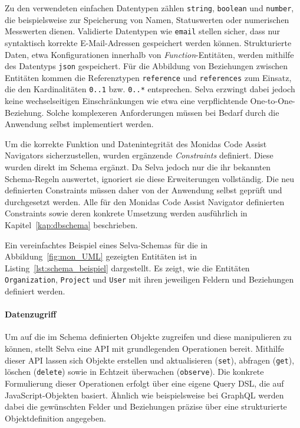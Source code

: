 Zu den verwendeten einfachen Datentypen zählen \texttt{string}, \texttt{boolean} und \texttt{number}, die beispielsweise zur Speicherung von Namen, Statuswerten oder numerischen Messwerten dienen. Validierte Datentypen wie \texttt{email} stellen sicher, dass nur syntaktisch korrekte E-Mail-Adressen gespeichert werden können. Strukturierte Daten, etwa Konfigurationen innerhalb von \textit{Function}-Entitäten, werden mithilfe des Datentyps \texttt{json} gespeichert. Für die Abbildung von Beziehungen zwischen Entitäten kommen die Referenztypen \texttt{reference} und \texttt{references} zum Einsatz, die den Kardinalitäten \texttt{0..1} bzw. \texttt{0..*} entsprechen. Selva erzwingt dabei jedoch keine wechselseitigen Einschränkungen wie etwa eine verpflichtende One-to-One-Beziehung. Solche komplexeren Anforderungen müssen bei Bedarf durch die Anwendung selbst implementiert werden.



Um die korrekte Funktion und Datenintegrität des Monidas Code Assist Navigators sicherzustellen, wurden ergänzende \textit{Constraints} definiert. Diese wurden direkt im Schema ergänzt. Da Selva jedoch nur die ihr bekannten Schema-Regeln auswertet, ignoriert sie diese Erweiterungen vollständig. Die neu definierten Constraints müssen daher von der Anwendung selbst geprüft und durchgesetzt werden. Alle für den Monidas Code Assist Navigator definierten Constraints sowie deren konkrete Umsetzung werden ausführlich in Kapitel~\ref{kap:dbschema} beschrieben.

Ein vereinfachtes Beispiel eines Selva-Schemas für die in Abbildung~\ref{fig:mon_UML} gezeigten Entitäten ist in Listing~\ref{lst:schema_beispiel} dargestellt. Es zeigt, wie die Entitäten \texttt{Organization}, \texttt{Project} und \texttt{User} mit ihren jeweiligen Feldern und Beziehungen definiert werden.

\newpage





\paragraph{Datenzugriff}
\label{sec:Datenzugriff}Um auf die im Schema definierten Objekte zugreifen und diese manipulieren zu können, stellt Selva eine API mit grundlegenden Operationen bereit. Mithilfe dieser API lassen sich Objekte erstellen und aktualisieren (\texttt{set}), abfragen (\texttt{get}), löschen (\texttt{delete}) sowie in Echtzeit überwachen (\texttt{observe}). Die konkrete Formulierung dieser Operationen erfolgt über eine eigene Query DSL, die auf JavaScript-Objekten basiert. Ähnlich wie beispielsweise bei GraphQL werden dabei die gewünschten Felder und Beziehungen präzise über eine strukturierte Objektdefinition angegeben.

